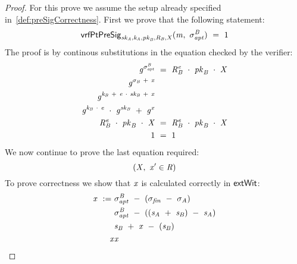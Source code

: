\begin{proof}
    \label{prf:aptSchnorrPreSigCorr}
    For this prove we assume the setup already specified in~\ref{def:preSigCorrectness}.
    First we prove that the following statement:
    \[
        \mathsf{vrfPtPreSig}_{\mathit{sk}_{\mathit{A}},\mathit{\mathit{k}_{\mathit{A}}},\mathit{pk}_{\mathit{B}},\mathit{R}_{\mathit{B}},\mathit{X}}(\mathit{m} ,~ \sigma^{\mathit{B}}_{\mathit{apt}}) ~=~ 1
    \]
    The proof is by continous substitutions in the equation checked by the verifier:
    \begin{align}
        \mathit{g}^{\sigma^{\mathit{B}}_{\mathit{apt}}} &~=~ \mathit{R}_{\mathit{B}}^{\mathit{e}} ~\cdot~ \mathit{pk}_{\mathit{B}} ~\cdot~ \mathit{X} \\
        \mathit{g}^{\sigma_{\mathit{B}} ~+~ \mathit{x}} & \\
        \mathit{g}^{\mathit{\mathit{k}_{\mathit{B}}} ~+~ \mathit{e} ~\cdot~ \mathit{sk}_{\mathit{B}} ~+~ \mathit{x}} & \\
        \mathit{g}^{\mathit{\mathit{k}_{\mathit{B}}} ~\cdot~ \mathit{e}} ~\cdot~ \mathit{g}^{\mathit{sk}_{\mathit{B}}} ~+~ \mathit{g}^{\mathit{x}} & \\
        \mathit{R}_{\mathit{B}}^{\mathit{e}} ~\cdot~ \mathit{pk}_{\mathit{B}} ~\cdot~ \mathit{X} &~=~ \mathit{R}_{\mathit{B}}^{\mathit{e}} ~\cdot~ \mathit{pk}_{\mathit{B}} ~\cdot~ \mathit{X} \\
        1 &~=~ 1
    \end{align}
    We now continue to prove the last equation required:
    \[
        (\mathit{X} ,~ \mathit{x}' \in \mathit{R})
    \]
    To prove correctness we show that $\mathit{x}$ is calculated correctly in $\mathsf{extWit}$:
    \begin{align}
        \mathit{x} ~:=~ & \sigma^{\mathit{B}}_{\mathit{apt}} ~-~ (\sigma_{\mathit{fin}} ~-~ \sigma_{\mathit{A}}) \\
        & \sigma^{\mathit{B}}_{\mathit{apt}} ~-~ ((\mathit{s}_{\mathit{A}} ~+~ \mathit{s}_{\mathit{B}} ) ~-~ \mathit{s}_{\mathit{A}} ) \\
        & \mathit{s}_{\mathit{B}} ~+~ \mathit{x} ~-~ (\mathit{s}_{\mathit{B}}) \\
        \mathit{x} & \mathit{x} \\
    \end{align}

\end{proof}